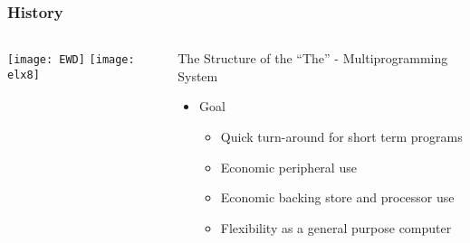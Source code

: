 \begin{frame}[plain]
	\frametitle{History}
	
	
	
	\begin{columns}
		
		\begin{column}{.4\textwidth}
			\centering
			\texttt{[image: EWD]}
			\texttt{[image: elx8]}
			
			
			
		\end{column}
		
		\begin{column}{.6\textwidth}
			
			The Structure of the “The” - Multiprogramming System
			\begin{itemize}
				\item Goal
				\begin{itemize}
					\item Quick turn-around for short term programs
					\item Economic peripheral use
					\item Economic backing store and processor use
					\item Flexibility as a general purpose computer
				\end{itemize}
				
			\end{itemize}	
			
		\end{column}
		
		
	\end{columns}
	
	
\end{frame}


